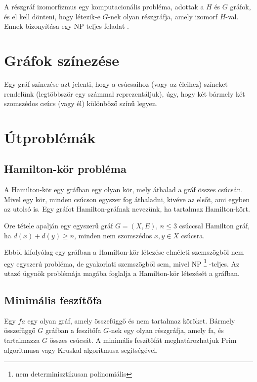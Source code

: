 A részgráf izomorfizmus egy komputacionális probléma, adottak a \(H\) és \(G\) gráfok, és el kell dönteni, hogy létezik-e \(G\)-nek olyan részgráfja, amely izomorf \(H\)-val. Ennek bizonyítása egy NP-teljes feladat \cite{14}.

\section{Gráfok színezése}\label{sec:ALAP:adatelem}

Egy gráf színezése azt jelenti, hogy a csúcsaihoz (vagy az éleihez) színeket rendelünk (legtöbbször egy számmal reprezentáljuk), úgy, hogy két bármely két szomszédos csúcs (vagy él) különböző színű legyen.

\section{Útproblémák}\label{sec:ALAP:adatelem}

\subsection{Hamilton-kör probléma}

A Hamilton-kör egy gráfban egy olyan kör, mely áthalad a gráf összes csúcsán. Mivel egy kör, minden csúcson egyszer fog áthaladni, kivéve az elsőt, ami egyben az utolsó is. Egy gráfot Hamilton-gráfnak nevezünk, ha tartalmaz Hamilton-kört.

Ore tétele apalján egy egyszerű gráf \(G = (X,E)\), \(n \leq 3\) csúccsal Hamilton gráf, ha \(d(x) + d(y)  \geq n\), minden nem szomszédos \(x,y \in X\) csúcsra.

Ebből kifolyólag egy gráfban a Hamilton-kör létezése elméleti szemszögből nem egy egyszerú probléma, de gyakorlati szemszögből sem, mivel NP%
\footnote{ %
	nem determinisztikusan polinomiális
}  %
-teljes. Az utazó ügynök problémája magába foglalja a Hamilton-kör létezését a gráfban.

\subsection{Minimális feszítőfa}

Egy \(fa\) egy olyan gráf, amely összefüggő és nem tartalmaz köröket. Bármely összefüggő \(G\) gráfban a feszítőfa \(G\)-nek egy olyan részgráfja, amely fa, és tartalmazza \(G\) összes csúcsát. A minimális feszítőfát meghatározhatjuk Prim algoritmusa vagy Kruskal algoritmusa segítségével.

